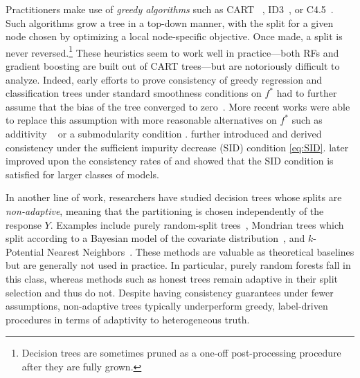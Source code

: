 \documentclass[11pt]{article}
\newcommand{\comment}[2]{{#2}}
\begin{document}
Practitioners make use of \emph{greedy algorithms} such as CART ~\citep{breiman1984classification}, ID3~\citep{quinlan1986induction}, or C4.5~\citep{quinlan1993c4}.
Such algorithms grow a tree in a top-down manner, with the split for a given node chosen by optimizing a local node-specific objective.
Once made, a split is never reversed.\footnote{Decision trees are sometimes pruned as a one-off post-processing procedure after they are fully grown.}
These heuristics seem to work well in practice---both RFs and gradient boosting are built out of CART trees---but are notoriously difficult to analyze.
Indeed, early efforts to prove consistency of greedy regression and classification trees under standard smoothness conditions on $f^*$ had to further assume that the bias of the tree converged to zero~\citep{breiman1984classification,chaudhuri1995generalized}.
More recent works were able to replace this assumption with more reasonable alternatives on $f^*$ such as additivity ~\citep{scornet2015,klusowski2020sparse,klusowski2024large} or a submodularity condition \citep{syrgkanis2020estimation}.
\cite{chi2022asymptotic} further introduced and derived consistency under the sufficient impurity decrease (SID) condition \eqref{eq:SID}.
\cite{mazumder2024convergence} later improved upon the consistency rates of \cite{chi2022asymptotic} and showed that the SID condition is satisfied for larger classes of models.

\comment{red}{In another line of work, researchers have studied decision trees whose splits are \emph{non-adaptive}, meaning that the partitioning is chosen independently of the response $Y$. Examples include purely random-split trees~\citep{biau2008consistency,biau2012analysis,klusowski2021sharp}, Mondrian trees which split according to a Bayesian model of the covariate distribution~\citep{roy2008mondrian,lakshminarayanan2014mondrian,mourtada2017universal,cattaneo2023inference}, and $k$-Potential Nearest Neighbors~\citep{lin2006random,biau2010layered,scornet2016random,biau2016random,shi2024multivariate}. These methods are valuable as theoretical baselines but are generally not used in practice. In particular, purely random forests fall in this class, whereas methods such as honest trees remain adaptive in their split selection and thus do not. Despite having consistency guarantees under fewer assumptions, non-adaptive trees typically underperform greedy, label-driven procedures in terms of adaptivity to heterogeneous truth.}
\end{document}
